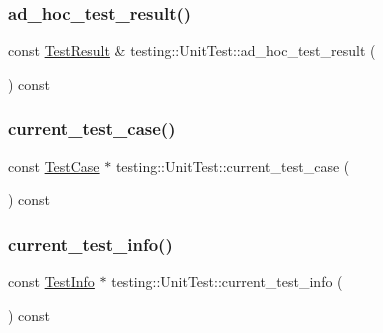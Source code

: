 \subsubsection{\texorpdfstring{ad\_hoc\_test\_result()}{ad\_hoc\_test\_result()}}
{\footnotesize\ttfamily const \mbox{\hyperlink{classtesting_1_1TestResult}{Test\+Result}} \& testing\+::\+Unit\+Test\+::ad\+\_\+hoc\+\_\+test\+\_\+result (\begin{DoxyParamCaption}{ }\end{DoxyParamCaption}) const}

\mbox{\label{classtesting_1_1UnitTest_a2bf61896036ae03edbd7bceed14f9e18}} 
\subsubsection{\texorpdfstring{current\_test\_case()}{current\_test\_case()}}
{\footnotesize\ttfamily const \mbox{\hyperlink{classtesting_1_1TestCase}{Test\+Case}} $\ast$ testing\+::\+Unit\+Test\+::current\+\_\+test\+\_\+case (\begin{DoxyParamCaption}{ }\end{DoxyParamCaption}) const}

\mbox{\label{classtesting_1_1UnitTest_a088eaf814a33085ace3d881d22e6bdea}} 
\subsubsection{\texorpdfstring{current\_test\_info()}{current\_test\_info()}}
{\footnotesize\ttfamily const \mbox{\hyperlink{classtesting_1_1TestInfo}{Test\+Info}} $\ast$ testing\+::\+Unit\+Test\+::current\+\_\+test\+\_\+info (\begin{DoxyParamCaption}{ }\end{DoxyParamCaption}) const}

\mbox{\label{classtesting_1_1UnitTest_ad69ccf3d4a9bc7333badeafbde3bc76b}} 
